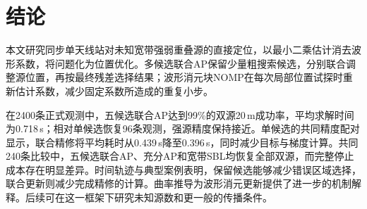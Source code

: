 \section{结论}\label{sec:conclusion}
本文研究同步单天线站对未知宽带强弱重叠源的直接定位，以最小二乘估计消去波形系数，将问题化为位置优化。多候选联合AP保留少量粗搜索候选，分别联合调整源位置，再按最终残差选择结果；波形消元块NOMP在每次局部位置试探时重新估计系数，减少固定系数所造成的重复小步。

在2400条正式观测中，五候选联合AP达到99\%的双源20\,m成功率，平均求解时间为0.718\,s；相对单候选恢复96条观测，强源精度保持接近。单候选的共同精度配对显示，联合精修将平均耗时从0.439\,s降至0.396\,s，同时减少目标与梯度计算。共同240条比较中，五候选联合AP、充分AP和宽带SBL均恢复全部双源，而完整停止成本存在明显差异。时间轨迹与典型案例表明，保留候选能够减少错误区域选择，联合更新则减少完成精修的计算。曲率推导为波形消元更新提供了进一步的机制解释。后续可在这一框架下研究未知源数和更一般的传播条件。
